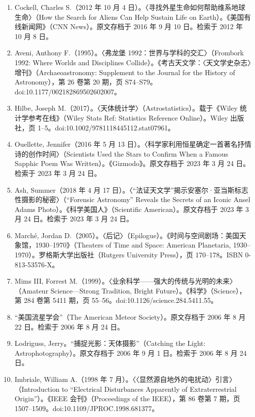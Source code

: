 \begin{enumerate}
  \item Cockell, Charles S.（2012 年 10 月 4 日）。〈寻找外星生命如何帮助维系地球生命〉（How the Search for Aliens Can Help Sustain Life on Earth）。《美国有线新闻网》（CNN News）。原文存档于 2016 年 9 月 10 日。检索于 2012 年 10 月 8 日。
  \item Aveni, Anthony F.（1995）。〈弗龙堡 1992：世界与学科的交汇〉（Frombork 1992: Where Worlds and Disciplines Collide）。《考古天文学：〈天文学史杂志〉增刊》（Archaeoastronomy: Supplement to the Journal for the History of Astronomy），第 26 卷第 20 期，页 S74–S79。doi:10.1177/002182869502602007。
  \item Hilbe, Joseph M.（2017）。〈天体统计学〉（Astrostatistics）。载于《Wiley 统计学参考在线》（Wiley Stats Ref: Statistics Reference Online）。Wiley 出版社，页 1–5。doi:10.1002/9781118445112.stat07961。
  \item Ouellette, Jennifer（2016 年 5 月 13 日）。〈科学家利用恒星确定一首著名抒情诗的创作时间〉（Scientists Used the Stars to Confirm When a Famous Sapphic Poem Was Written）。《Gizmodo》。原文存档于 2023 年 3 月 24 日。检索于 2023 年 3 月 24 日。
  \item Ash, Summer（2018 年 4 月 17 日）。〈“法证天文学”揭示安塞尔·亚当斯标志性摄影的秘密〉（“Forensic Astronomy” Reveals the Secrets of an Iconic Ansel Adams Photo）。《科学美国人》（Scientific American）。原文存档于 2023 年 3 月 24 日。检索于 2023 年 3 月 24 日。
  \item Marché, Jordan D.（2005）。〈后记〉（Epilogue）。《时间与空间剧场：美国天象馆，1930–1970》（Theaters of Time and Space: American Planetaria, 1930–1970）。罗格斯大学出版社（Rutgers University Press），页 170–178。ISBN 0-813-53576-X。
  \item Mims III, Forrest M.（1999）。〈业余科学——强大的传统与光明的未来〉（Amateur Science—Strong Tradition, Bright Future）。《科学》（Science），第 284 卷第 5411 期，页 55–56。doi:10.1126/science.284.5411.55。
  \item “美国流星学会”（The American Meteor Society）。原文存档于 2006 年 8 月 22 日。检索于 2006 年 8 月 24 日。
  \item Lodriguss, Jerry。“捕捉光影：天体摄影”（Catching the Light: Astrophotography）。原文存档于 2006 年 9 月 1 日。检索于 2006 年 8 月 24 日。
  \item Imbriale, William A.（1998 年 7 月）。〈〈显然源自地外的电扰动〉引言〉（Introduction to “Electrical Disturbances Apparently of Extraterrestrial Origin”）。《IEEE 会刊》（Proceedings of the IEEE），第 86 卷第 7 期，页 1507–1509。doi:10.1109/JPROC.1998.681377。

\end{enumerate}
